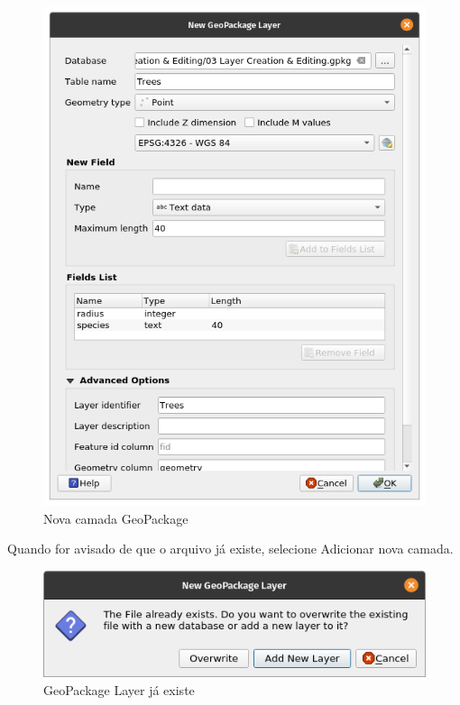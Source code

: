 \documentclass[
  portuguese,
]{krantz}
\begin{document}
\begin{figure}
\centering
\includegraphics{media/modulo2/virtual-1.png}
\caption{Nova camada GeoPackage}
\end{figure}

Quando for avisado de que o arquivo já existe, selecione Adicionar nova camada.

\begin{figure}
\centering
\includegraphics{media/modulo2/virtual-2.png}
\caption{GeoPackage Layer já existe}
\end{figure}
\end{document}

